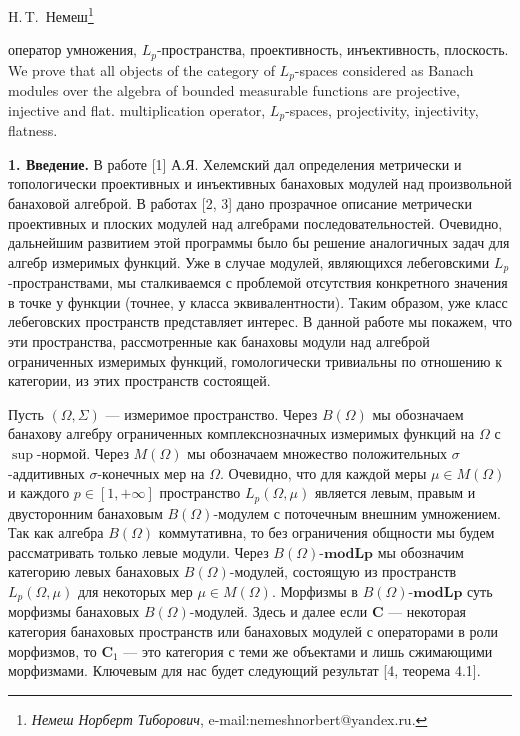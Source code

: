 \documentclass[11pt,twoside]{article}
\begin{document}
\cleanbegin

\def\udk{517.986.225}
{H.\,T.~Немеш\footnote[1]
{{\it Немеш Норберт Тиборович}, e-mail:nemeshnorbert@yandex.ru.}}


{оператор умножения, $L_p$-пространства, проективность, инъективность, плоскость.}
{ 
We prove that all objects of the category of $L_p$-spaces considered as Banach modules over the algebra of bounded measurable functions are projective, injective and flat.
}
{multiplication operator, $L_p$-spaces, projectivity, injectivity, flatness.}


\textbf{1. Введение.} В работе [1] А.Я. Хелемский дал определения метрически и топологически проективных и инъективных банаховых модулей над произвольной банаховой алгеброй. В работах [2, 3] дано прозрачное описание метрически проективных и плоских модулей над алгебрами последовательностей. Очевидно, дальнейшим развитием этой программы было бы решение аналогичных задач для алгебр измеримых функций. Уже в случае модулей, являющихся лебеговскими $L_p$-пространствами, мы сталкиваемся с проблемой отсутствия конкретного значения в точке у функции (точнее, у класса эквивалентности). Таким образом, уже класс лебеговских пространств представляет интерес. В данной работе мы покажем, что эти пространства, рассмотренные как банаховы модули над алгеброй ограниченных измеримых функций, гомологически тривиальны по отношению к категории, из этих пространств состоящей.

Пусть $(\Omega,\Sigma)$ --- измеримое пространство. Через $B(\Omega)$ мы обозначаем банахову алгебру ограниченных комплекснозначных измеримых функций на $\Omega$ с $\sup$-нормой. Через $M(\Omega)$ мы обозначаем множество положительных $\sigma$-аддитивных $\sigma$-конечных мер на $\Omega$. Очевидно, что для каждой меры $\mu\in M(\Omega)$ и каждого $p\in[1,+\infty]$ пространство $L_p(\Omega,\mu)$ является левым, правым и двусторонним банаховым $B(\Omega)$-модулем с поточечным внешним умножением. Так как алгебра $B(\Omega)$ коммутативна, то без ограничения общности мы будем рассматривать только левые модули. Через $B(\Omega)$-$\mathbf{modLp}$ мы обозначим категорию левых банаховых $B(\Omega)$-модулей, состоящую из пространств $L_p(\Omega,\mu)$ для некоторых мер $\mu\in M(\Omega)$. Морфизмы в $B(\Omega)$-$\mathbf{modLp}$ суть морфизмы банаховых $B(\Omega)$-модулей. Здесь и далее если $\mathbf{C}$ --- некоторая категория банаховых пространств или банаховых модулей с операторами в роли морфизмов, то $\mathbf{C}_1$ --- это категория с теми же объектами и лишь сжимающими морфизмами. Ключевым для нас будет следующий результат [4, теорема 4.1].
\end{document}
